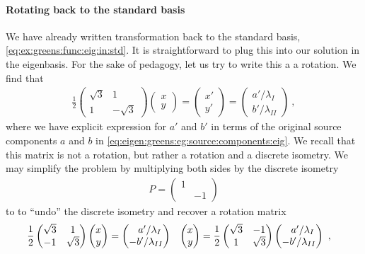 \documentclass[12pt, oneside]{report}    %
\begin{document}
\paragraph{Rotating back to the standard basis} We have already written transformation back to the standard basis, \eqref{eq:ex:greens:func:eig:in:std}. It is straightforward to plug this into our solution in the eigenbasis. For the sake of pedagogy, let us try to write this a a rotation. We find that
\begin{align}
    \frac{1}{2}
    \begin{pmatrix}
        \sqrt{3} & 1\\
        1 & -\sqrt{3}
    \end{pmatrix}
    \begin{pmatrix}
        x \\ y
    \end{pmatrix}
    = 
    \begin{pmatrix}
        x' \\ y'
    \end{pmatrix}
    =
    \begin{pmatrix}
        a'/\lambda_{I}\\
        b'/\lambda_{II}
    \end{pmatrix} \ ,
\end{align}
where we have explicit expression for $a'$ and $b'$ in terms of the original source components $a$ and $b$ in \eqref{eq:eigen:greens:eg:source:components:eig}. We recall that this matrix is not a rotation, but rather a rotation and a discrete isometry. We may simplify the problem by multiplying both sides by the discrete isometry 
\begin{align}
    P = \begin{pmatrix}
        1 & \\
        & - 1
    \end{pmatrix} 
\end{align}
to to ``undo'' the discrete isometry and recover a rotation matrix
\begin{align}
    \frac{1}{2}
    \begin{pmatrix}
        \sqrt{3} & 1\\
        -1 & \sqrt{3}
    \end{pmatrix}
    \begin{pmatrix}
        x \\ y
    \end{pmatrix}
    &=
    \begin{pmatrix}
        \pp a'/\lambda_{I}\\
        -b'/\lambda_{II}
    \end{pmatrix} 
    &
    \begin{pmatrix}
        x \\ y
    \end{pmatrix}
    &=
    \frac{1}{2}
    \begin{pmatrix}
        \sqrt{3} & -1\\
        1 & \sqrt{3}
    \end{pmatrix}
    \begin{pmatrix}
        \pp a'/\lambda_{I}\\
        -b'/\lambda_{II}
    \end{pmatrix} \ ,
\end{align}
\end{document}
